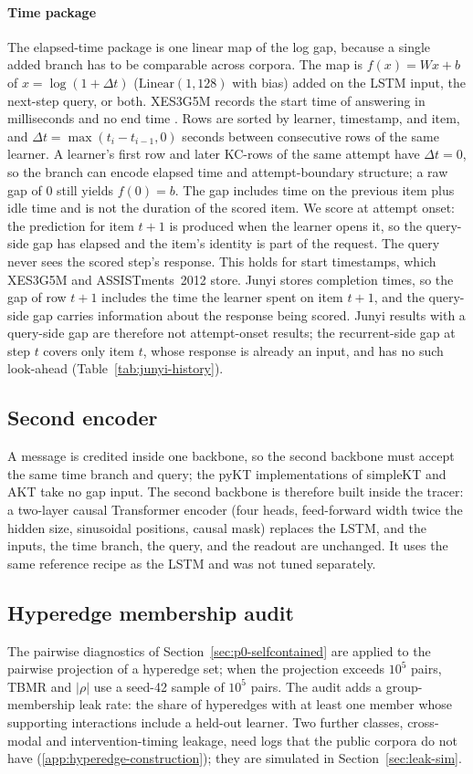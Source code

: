 \documentclass[review,12pt]{elsarticle}
\begin{document}
\paragraph{Time package}
The elapsed-time package is one linear map of the log gap, because a
single added branch has to be comparable across corpora. The map is
$f(x)=Wx+b$ of $x=\log(1+\Delta t)$
($\mathrm{Linear}(1,128)$ with bias) added on the LSTM input, the
next-step query, or both. XES3G5M records the start time of answering
in milliseconds and no end time \cite{liu2023xes3g5m}. Rows are sorted
by learner, timestamp, and item, and $\Delta t=\max(t_i-t_{i-1},0)$
seconds between consecutive rows of the same learner. A learner's first
row and later KC-rows of the same attempt have $\Delta t{=}0$, so the
branch can encode elapsed time and attempt-boundary structure; a raw
gap of $0$ still yields $f(0)=b$. The gap includes time on the previous
item plus idle time and is not the duration of the scored item. We
score at attempt onset: the prediction for item $t{+}1$ is produced when
the learner opens it, so the query-side gap has elapsed and the item's
identity is part of the request. The query never sees the scored
step's response. This holds for start timestamps, which XES3G5M and
ASSISTments~2012 store. Junyi stores completion times, so the gap of
row $t{+}1$ includes the time the learner spent on item $t{+}1$, and the
query-side gap carries information about the response being scored.
Junyi results with a query-side gap are therefore not attempt-onset
results; the recurrent-side gap at step $t$ covers only item $t$, whose
response is already an input, and has no such look-ahead
(Table~\ref{tab:junyi-history}).

\subsection{Second encoder}
\label{sec:second-encoder}
A message is credited inside one backbone, so the second backbone must
accept the same time branch and query; the pyKT implementations of simpleKT
and AKT take no gap input. The second backbone is therefore built
inside the tracer: a two-layer causal
Transformer encoder (four heads, feed-forward width twice the hidden
size, sinusoidal positions, causal mask) replaces the LSTM, and the
inputs, the time branch, the query, and the readout are unchanged. It
uses the same reference recipe as the LSTM and was not tuned
separately.

\subsection{Hyperedge membership audit}
\label{sec:leakage-ext}
The pairwise diagnostics of Section~\ref{sec:p0-selfcontained} are
applied to the pairwise projection of a hyperedge set; when the
projection exceeds $10^5$ pairs, TBMR and $|\rho|$ use a seed-42
sample of $10^5$ pairs. The audit adds a group-membership leak rate:
the share of hyperedges with at least one member whose supporting
interactions include a held-out learner. Two further classes,
cross-modal and intervention-timing leakage, need logs that the public
corpora do not have (\ref{app:hyperedge-construction}); they are
simulated in Section~\ref{sec:leak-sim}.
\end{document}
